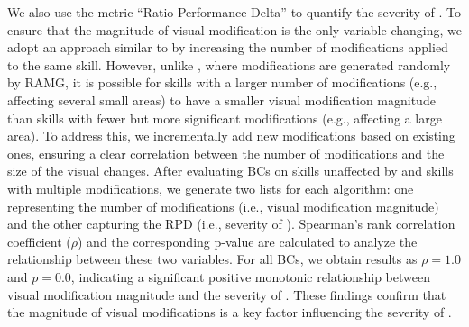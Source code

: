 We also use the metric ``Ratio Performance Delta'' to quantify the severity of \pb. To ensure that the magnitude of visual modification is the only variable changing, we adopt an approach similar to \bmb by increasing the number of modifications applied to the same skill. However, unlike \bmb, where modifications are generated randomly by RAMG, it is possible for skills with a larger number of modifications (e.g., affecting several small areas) to have a smaller visual modification magnitude than skills with fewer but more significant modifications (e.g., affecting a large area). To address this, we incrementally add new modifications based on existing ones, ensuring a clear correlation between the number of modifications and the size of the visual changes. After evaluating BCs on skills unaffected by \pb and skills with multiple modifications, we generate two lists for each algorithm: one representing the number of modifications (i.e., visual modification magnitude) and the other capturing the RPD (i.e., severity of \pb). Spearman's rank correlation coefficient ($\rho$) and the corresponding p-value are calculated to analyze the relationship between these two variables. For all BCs, we obtain results as $\rho = 1.0$ and $p = 0.0$, indicating a significant positive monotonic relationship between visual modification magnitude and the severity of \pb. These findings confirm that the magnitude of visual modifications is a key factor influencing the severity of \pb.